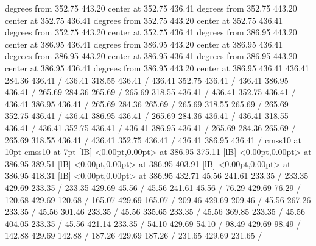 { degrees from 352.75 443.20 center at 352.75 436.41
 degrees from 352.75 443.20 center at 352.75 436.41
 degrees from 352.75 443.20 center at 352.75 436.41
 degrees from 352.75 443.20 center at 352.75 436.41
 degrees from 386.95 443.20 center at 386.95 436.41
 degrees from 386.95 443.20 center at 386.95 436.41
 degrees from 386.95 443.20 center at 386.95 436.41
 degrees from 386.95 443.20 center at 386.95 436.41
 degrees from 386.95 443.20 center at 386.95 436.41
\setdashpattern <4pt, 4pt>
 436.41 284.36 436.41 /
 436.41 318.55 436.41 /
 436.41 352.75 436.41 /
 436.41 386.95 436.41 /
\setdashpattern <4pt, 4pt>
 265.69 284.36 265.69 /
 265.69 318.55 436.41 /
 436.41 352.75 436.41 /
 436.41 386.95 436.41 /
\setdashpattern <4pt, 4pt>
 265.69 284.36 265.69 /
 265.69 318.55 265.69 /
 265.69 352.75 436.41 /
 436.41 386.95 436.41 /
\setdashpattern <4pt, 4pt>
 265.69 284.36 436.41 /
 436.41 318.55 436.41 /
 436.41 352.75 436.41 /
 436.41 386.95 436.41 /
\setdashpattern <4pt, 4pt>
 265.69 284.36 265.69 /
 265.69 318.55 436.41 /
 436.41 352.75 436.41 /
 436.41 386.95 436.41 /
\font\picfont cmss10 at 10pt\picfont
\font\picfont cmss10 at 7pt\picfont
{}  [lB] <0.00pt,0.00pt> at 386.95 375.11
  [lB] <0.00pt,0.00pt> at 386.95 389.51
  [lB] <0.00pt,0.00pt> at 386.95 403.91
  [lB] <0.00pt,0.00pt> at 386.95 418.31
  [lB] <0.00pt,0.00pt> at 386.95 432.71
\setsolid
{} 45.56 241.61 233.35 /
 233.35 429.69 233.35 /
 233.35 429.69 45.56 /
 45.56 241.61 45.56 /
\setsolid
{} 76.29 429.69 76.29 /
\setsolid
{} 120.68 429.69 120.68 /
\setsolid
{} 165.07 429.69 165.07 /
\setsolid
{} 209.46 429.69 209.46 /
\setsolid
{} 45.56 267.26 233.35 /
\setsolid
{} 45.56 301.46 233.35 /
\setsolid
{} 45.56 335.65 233.35 /
\setsolid
{} 45.56 369.85 233.35 /
\setsolid
{} 45.56 404.05 233.35 /
\setsolid
{} 45.56 421.14 233.35 /
\setsolid
{} 54.10 429.69 54.10 /
\setsolid
{} 98.49 429.69 98.49 /
\setsolid
{} 142.88 429.69 142.88 /
\setsolid
{} 187.26 429.69 187.26 /
\setsolid
{} 231.65 429.69 231.65 /
}
